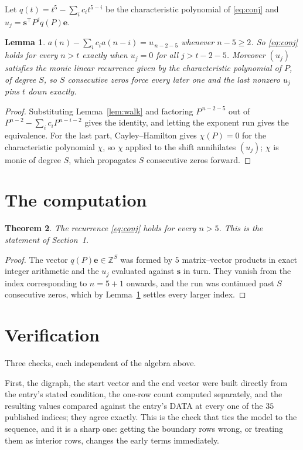\documentclass[11pt,a4paper]{article}
\theoremstyle{plain}
\newtheorem{theorem}{Theorem}
\newtheorem{lemma}[theorem]{Lemma}
\theoremstyle{definition}
\begin{document}
Let $q(t)=t^{5}-\sum_i c_i t^{5-i}$ be the characteristic polynomial of
\eqref{eq:conj} and $u_j=\mathbf{s}^{\!\top}P^{j}q(P)\mathbf{e}$.

\begin{lemma}\label{lem:crit}
$a(n)-\sum_i c_i a(n-i)=u_{\,n-2-5}$ whenever $n-5\ge2$. So \eqref{eq:conj}
holds for every $n>t$ exactly when $u_j=0$ for all $j>t-2-5$. Moreover $(u_j)$
satisfies the monic linear recurrence given by the characteristic polynomial of $P$, of
degree $S$, so $S$ consecutive zeros force every later one and the last nonzero $u_j$ pins
$t$ down exactly.
\end{lemma}

\begin{proof}
Substituting Lemma~\ref{lem:walk} and factoring $P^{\,n-2-5}$ out of
$P^{n-2}-\sum_i c_i P^{n-i-2}$ gives the identity, and letting the exponent run gives the
equivalence. For the last part, Cayley--Hamilton gives $\chi(P)=0$ for the characteristic
polynomial $\chi$, so $\chi$ applied to the shift annihilates $(u_j)$; $\chi$ is monic of
degree $S$, which propagates $S$ consecutive zeros forward.
\end{proof}

\section{The computation}

\begin{theorem}
The recurrence \eqref{eq:conj} holds for every $n>5$. This is the statement of
Section~1.
\end{theorem}

\begin{proof}
The vector $q(P)\mathbf{e}\in\mathbb{Z}^{S}$ was formed by $5$ matrix--vector
products in exact integer arithmetic and the $u_j$ evaluated against $\mathbf{s}$ in turn.
They vanish from the index corresponding to $n=5+1$ onwards, and the run was continued
past $S$ consecutive zeros, which by Lemma~\ref{lem:crit} settles every larger index.
\end{proof}

\section{Verification}

Three checks, each independent of the algebra above.

First, the digraph, the start vector and the end vector were built directly from the
entry's stated condition, the one-row count computed separately, and the resulting values
compared against the entry's DATA at every one of the $35$ published indices; they
agree exactly. This is the check that ties the model to the sequence, and it is a sharp one:
getting the boundary rows wrong, or treating them as interior rows, changes the early terms
immediately.
\end{document}
